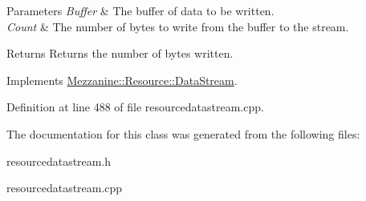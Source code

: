 \begin{DoxyParams}{Parameters}
{\em Buffer} & The buffer of data to be written. \\
\hline
{\em Count} & The number of bytes to write from the buffer to the stream. \\
\hline
\end{DoxyParams}
\begin{DoxyReturn}{Returns}
Returns the number of bytes written. 
\end{DoxyReturn}
 

Implements \hyperlink{classMezzanine_1_1Resource_1_1DataStream_aafdbe4aeb8e8743d514fbd1075a30859}{Mezzanine::Resource::DataStream}.



Definition at line 488 of file resourcedatastream.cpp.



The documentation for this class was generated from the following files:\begin{DoxyCompactItemize}
\item 
resourcedatastream.h\item 
resourcedatastream.cpp\end{DoxyCompactItemize}
